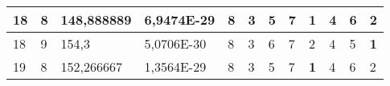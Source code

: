 \documentclass[conference]{IEEEtran}
\begin{document}
\begin{table*}[]
\begin{tabular}{|llll|llllllll|}
\multicolumn{1}{|l|}{18}                                                    & \multicolumn{1}{l|}{8}                                                        & \multicolumn{1}{l|}{148,888889}                                                   & 6,9474E-29                     & \multicolumn{1}{l|}{8}                                                  & \multicolumn{1}{l|}{3}                                                  & \multicolumn{1}{l|}{5}                                                  & \multicolumn{1}{l|}{7}                                                  & \multicolumn{1}{l|}{\textbf{1}}                                         & \multicolumn{1}{l|}{4}                                                  & \multicolumn{1}{l|}{6}                                                  & 2                          \\ \hline
\multicolumn{1}{|l|}{18}                                                    & \multicolumn{1}{l|}{9}                                                        & \multicolumn{1}{l|}{154,3}                                                        & 5,0706E-30                     & \multicolumn{1}{l|}{8}                                                  & \multicolumn{1}{l|}{3}                                                  & \multicolumn{1}{l|}{6}                                                  & \multicolumn{1}{l|}{7}                                                  & \multicolumn{1}{l|}{2}                                                  & \multicolumn{1}{l|}{4}                                                  & \multicolumn{1}{l|}{5}                                                  & \textbf{1}                 \\ \hline
\multicolumn{1}{|l|}{19}                                                    & \multicolumn{1}{l|}{8}                                                        & \multicolumn{1}{l|}{152,266667}                                                   & 1,3564E-29                     & \multicolumn{1}{l|}{8}                                                  & \multicolumn{1}{l|}{3}                                                  & \multicolumn{1}{l|}{5}                                                  & \multicolumn{1}{l|}{7}                                                  & \multicolumn{1}{l|}{\textbf{1}}                                         & \multicolumn{1}{l|}{4}                                                  & \multicolumn{1}{l|}{6}                                                  & 2                          \\ \hline

\end{tabular}
\end{table*}
\end{document}

